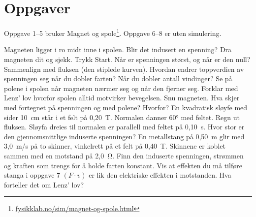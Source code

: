 \documentclass[11pt]{article}
\begin{document}

\section*{Oppgaver}

Oppgave 1–5 bruker Magnet og spole\footnote{\url{fysikklab.no/sim/magnet-og-spole.html}}. Oppgave 6–8 er uten simulering.

\begin{oppgaveliste}
\oppgave {}Magneten ligger i ro midt inne i spolen. Blir det indusert en spenning? Dra magneten dit og sjekk.
\svar
\oppgave {}Trykk Start. Når er spenningen størst, og når er den null? Sammenlign med fluksen (den stiplede kurven).
\svar
\oppgave {}Hvordan endrer toppverdien av spenningen seg når du dobler farten? Når du dobler antall vindinger?
\svar
\oppgave {}Se på polene i spolen når magneten nærmer seg og når den fjerner seg. Forklar med Lenz' lov hvorfor spolen alltid motvirker bevegelsen.
\svar
\oppgave {}Snu magneten. Hva skjer med fortegnet på spenningen og med polene? Hvorfor?
\svar
\oppgave {}En kvadratisk sløyfe med sider 10~cm står i et felt på 0,20~T. Normalen danner 60° med feltet. Regn ut fluksen. Sløyfa dreies til normalen er parallell med feltet på 0,10~s. Hvor stor er den gjennomsnittlige induserte spenningen?
\svar
\oppgave {}En metallstang på 0,50~m glir med 3,0~m/s på to skinner, vinkelrett på et felt på 0,40~T. Skinnene er koblet sammen med en motstand på 2,0~Ω. Finn den induserte spenningen, strømmen og kraften som trengs for å holde farten konstant.
\svar
\oppgave {}Vis at effekten du må tilføre stanga i oppgave 7 $(F \cdot v)$ er lik den elektriske effekten i motstanden. Hva forteller det om Lenz' lov?
\svar
\end{oppgaveliste}
\end{document}
